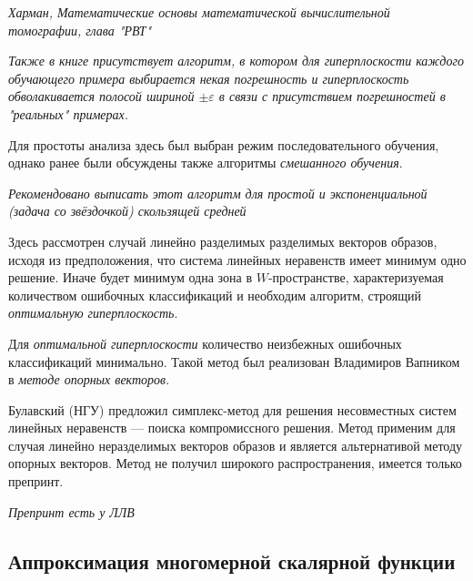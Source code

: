 \documentclass{article}
\numberwithin{equation}{subsection}
\begin{document}
\begin{myquote}
    \textit{Харман, Математические основы математической вычислительной томографии, глава "РВТ"}
\end{myquote}

\begin{myquote}
    \textit{Также в книге присутствует алгоритм, в котором для гиперплоскости каждого обучающего 
    примера выбирается некая погрешность и гиперплоскость обволакивается полосой
    шириной $\pm \varepsilon$ в связи с присутствием погрешностей в "реальных" примерах.}
\end{myquote}

Для простоты анализа здесь был выбран режим последовательного обучения, однако ранее были обсуждены 
также алгоритмы
\textit{смешанного обучения}.

\begin{myquote}
    \textit{Рекомендовано выписать этот алгоритм для простой и экспоненциальной (задача со звёздочкой) 
    скользящей средней}
\end{myquote}

Здесь рассмотрен случай линейно разделимых разделимых векторов образов, исходя из предположения, что система 
линейных неравенств имеет минимум одно решение.
Иначе будет минимум одна зона в $W$-пространстве, характеризуемая количеством ошибочных классификаций 
и необходим алгоритм, строящий \textit{оптимальную гиперплоскость}.

Для \textit{оптимальной гиперплоскости} количество неизбежных ошибочных классификаций минимально. 
Такой метод был реализован Владимиров Вапником в \textit{методе опорных векторов}.

Булавский (НГУ) предложил симплекс-метод для решения несовместных систем линейных неравенств --- 
поиска компромиссного решения. 
Метод применим для случая линейно неразделимых векторов образов и является альтернативой методу 
опорных векторов. 
Метод не получил широкого распространения, имеется только препринт.


\begin{myquote}
    \textit{Препринт есть у ЛЛВ}
\end{myquote}

\subsection{Аппроксимация многомерной скалярной функции}
\end{document}
